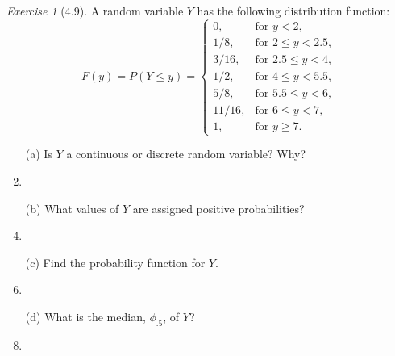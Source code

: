 \documentclass[12pt]{amsart}
\makeatletter
\theoremstyle{remark}
\newtheorem*{exercise}{Exercise}%
\renewenvironment{proof}[1][\proofname]{\par\doublespacing
  \pushQED{\qed}%
  \normalfont \topsep6\p@\@plus6\p@\relax
  \list{}{%
    \settowidth{\leftmargin}{\itshape\proofname:\hskip\labelsep}%
    \setlength{\labelwidth}{0pt}%
    \setlength{\itemindent}{-\leftmargin}%
  }%
  \item[\hskip\labelsep\itshape#1\@addpunct{:}]\ignorespaces
}{%
  \popQED\endlist\@endpefalse
  \singlespacing
}
\theoremstyle{mycomment}
\makeatother
\begin{document}
\begin{exercise}[4.9]
A random variable $Y$ has the following distribution function:
$$F(y) = P(Y \leq y) = \begin{cases}
0, & \text{for } y < 2, \\
1/8, & \text{for } 2 \leq y < 2.5, \\
3/16, & \text{for } 2.5 \leq y < 4, \\
1/2, & \text{for } 4 \leq y < 5.5, \\
5/8, & \text{for } 5.5 \leq y < 6, \\
11/16, & \text{for } 6 \leq y < 7, \\
1, & \text{for } y \geq 7.
\end{cases}$$

\begin{enumerate}
    \item[(a)] Is $Y$ a continuous or discrete random variable? Why?
\begin{proof}[Solution]
 
\end{proof}
    \item[(b)] What values of $Y$ are assigned positive probabilities?
\begin{proof}[Solution]
 
\end{proof}
    \item[(c)] Find the probability function for $Y$.
\begin{proof}[Solution]
 
\end{proof}
    \item[(d)] What is the median, $\phi_{.5}$, of $Y$?
\begin{proof}[Solution]
 
\end{proof}
\end{enumerate} 
\end{exercise}
\end{document}
